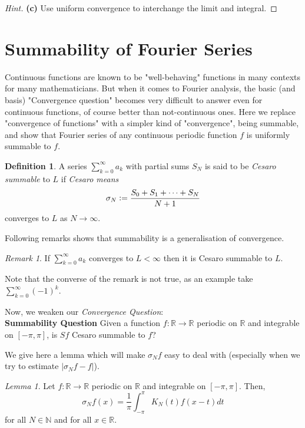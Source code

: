\documentclass{article}
\theoremstyle{remark}
\newtheorem*{remark}{Remark}
\theoremstyle{lemma}
\newtheorem{lemma}{Lemma}
\theoremstyle{example}
\theoremstyle{proofTrial}
\theoremstyle{definition}
\newtheorem{definition}{Definition}
\begin{document}
    \begin{proof}[Hint]
        \textbf{(c)} Use uniform convergence to interchange the limit and integral.
    \end{proof}

\section{Summability of Fourier Series}
Continuous functions are known to be "well-behaving" functions in many contexts for many mathematicians. But when it comes to Fourier analysis, the basic (and basis) "Convergence question" becomes very difficult to answer even for continuous functions, of course better than not-continuous ones. Here we replace "convergence of functions" with a simpler kind of "convergence", being summable, and show that Fourier series of any continuous periodic function \(f\) is uniformly summable to \(f\).

\begin{definition}
    A series $\sum_{k=0}^{\infty} a_k$ with partial sums $S_N$ is said to be \textit{Cesaro summable} to $L$ if \textit{Cesaro means}
    \[
    \sigma_N \vcentcolon =  \frac{S_0 + S_1 + \dots + S_N }{N+1}
    \]
    converges to $L$ as $N \longrightarrow \infty$.
\end{definition}
Following remarks shows that summability is a generalisation of convergence.
\begin{remark}
    If $\sum_{k=0}^{\infty} a_k$ converges to $L < \infty$ then it is Cesaro summable to $L$.
\end{remark}
Note that the converse of the remark is not true, as an example take $\sum_{k = 0}^{\infty} (-1) ^ k$.\par
Now, we weaken our \textit{Convergence Question}: \\
\textbf{Summability Question} Given a function $f: \mathbb{R} \xrightarrow{} \mathbb{R} $ periodic on $\mathbb{R}$ and integrable on $[-\pi, \pi]$, is $Sf$ Cesaro summable to \(f\)?\par
We give here a lemma which will make $\sigma_N f$ easy to deal with (especially when we try to estimate $|\sigma_N f - f|$).

\begin{lemma}
    Let $f: \mathbb{R} \xrightarrow{} \mathbb{R} $ periodic on $\mathbb{R}$ and integrable on $[-\pi, \pi]$. Then,
    \[
    \sigma_Nf(x) = \frac{1}{\pi} \int_{-\pi}^{\pi} K_N(t)f(x-t)dt
    \]
    for all $N \in \mathbb{N}$ and for all $ x \in \mathbb{R}$.\footnotemark{}
\end{lemma}
\end{document}
